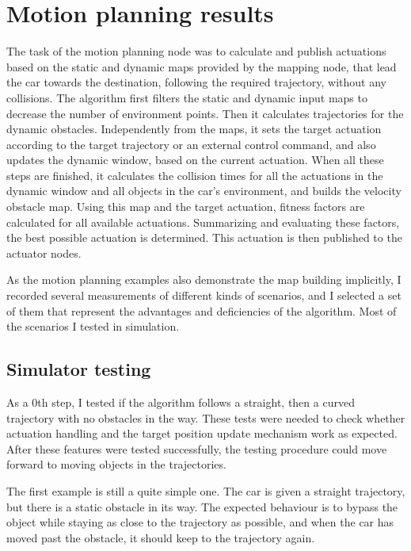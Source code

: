 \section{Motion planning results}
The task of the motion planning node was to calculate and publish actuations based on the static and dynamic maps provided by the mapping node, that lead the car towards the destination, following the required trajectory, without any collisions. The algorithm first filters the static and dynamic input maps to decrease the number of environment points. Then it calculates trajectories for the dynamic obstacles. Independently from the maps, it sets the target actuation according to the target trajectory or an external control command, and also updates the dynamic window, based on the current actuation. When all these steps are finished, it calculates the collision times for all the actuations in the dynamic window and all objects in the car's environment, and builds the velocity obstacle map. Using this map and the target actuation, fitness factors are calculated for all available actuations. Summarizing and evaluating these factors, the best possible actuation is determined. This actuation is then published to the actuator nodes.

As the motion planning examples also demonstrate the map building implicitly, I recorded several measurements of different kinds of scenarios, and I selected a set of them that represent the advantages and deficiencies of the algorithm. Most of the scenarios I tested in simulation.

\subsection{Simulator testing}
As a 0th step, I tested if the algorithm follows a straight, then a curved trajectory with no obstacles in the way. These tests were needed to check whether actuation handling and the target position update mechanism work as expected. After these features were tested successfully, the testing procedure could move forward to moving objects in the trajectories.

The first example is still a quite simple one. The car is given a straight trajectory, but there is a static obstacle in its way. The expected behaviour is to bypass the object while staying as close to the trajectory as possible, and when the car has moved past the obstacle, it should keep to the trajectory again.

